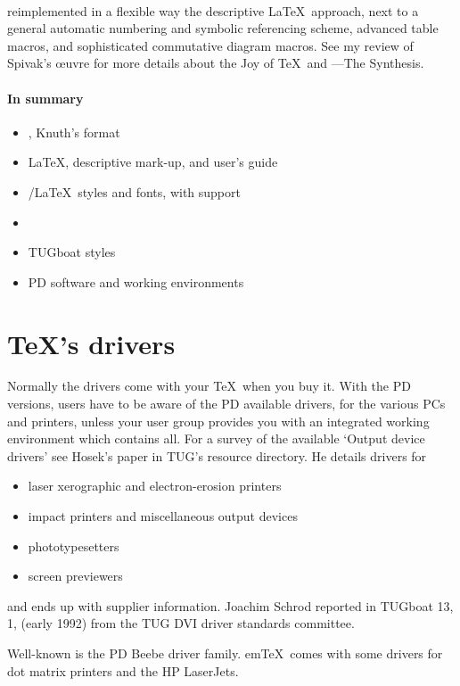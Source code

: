 \paragraph*{\LAMSTeX} reimplemented in a flexible way
  the descriptive \LaTeX\ approach, next to
  a general automatic numbering and symbolic referencing scheme,
  advanced table macros, and
  sophisticated commutative diagram macros.
  See my review of Spivak's \oe uvre
  for more details about the Joy of \TeX\ and \LAMSTeX---The Synthesis.

\paragraph*{In summary}
\begin{itemize}
\item \mmt, Knuth's format
\item \LaTeX, descriptive mark-up, and user's guide
\item \AmSTeX/\LaTeX\ styles and fonts, with support
\item \LAMSTeX
\item TUGboat styles
\item PD software and working environments
\end{itemize}

\section{\TeX's drivers}
Normally the drivers come with your \TeX\ when you buy it.
With the PD versions, users have to be aware of the PD available drivers,
for the various PCs and printers,
unless your user group provides you with an
integrated working environment which contains all.
For a survey of the available `Output device
drivers' see Hosek's paper in TUG's resource directory.
He details drivers for
\begin{itemize}
\item laser xerographic and electron-erosion printers
\item impact printers and miscellaneous output devices
\item phototypesetters
\item screen previewers
\end{itemize}
\noindent and ends up with supplier information.
Joachim Schrod reported in TUGboat 13, 1,
(early 1992) from the TUG DVI driver standards committee.

Well-known is the PD Beebe driver family. em\TeX\ comes with some
drivers for dot matrix printers and the HP LaserJets.

